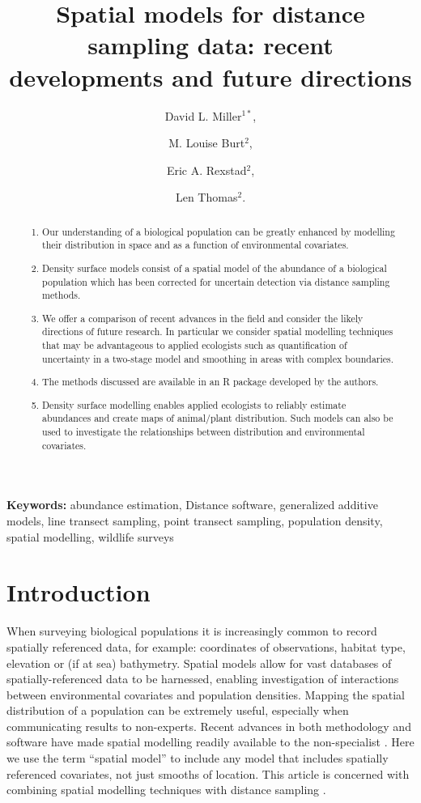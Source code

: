 \documentclass[a4paper,12pt]{article}
\title{Spatial models for distance sampling data: recent developments and future directions}
\author{
David L. Miller$^{1*}$, \and
M. Louise Burt$^{2}$, \and
Eric A. Rexstad$^{2}$, \and 
Len Thomas$^{2}$.}
\begin{document}
\maketitle

\begin{abstract}
  \noindent 

\begin{enumerate}
	\item Our understanding of a biological population can be greatly enhanced by modelling their distribution in space and as a function of environmental covariates. 
	\item Density surface models consist of a spatial model of the abundance of a biological population which has been corrected for uncertain detection via distance sampling methods. 
	\item We offer a comparison of recent advances in the field and consider the likely directions of future research. In particular we consider spatial modelling techniques that may be advantageous to applied ecologists such as quantification of uncertainty in a two-stage model and smoothing in areas with complex boundaries.
	\item The methods discussed are available in an \textsf{R} package developed by the authors.
	\item Density surface modelling enables applied ecologists to reliably estimate abundances and create maps of animal/plant distribution. Such models can also be used to investigate the relationships between distribution and environmental covariates.
\end{enumerate}
 

\end{abstract}

\noindent \textbf{Keywords:} abundance estimation, Distance software, generalized additive models, line transect sampling, point transect sampling, population density, spatial modelling, wildlife surveys


\newpage

\section*{Introduction}
\label{s:intro}

When surveying biological populations it is increasingly common to record spatially referenced data, for example: coordinates of observations, habitat type, elevation or (if at sea) bathymetry. Spatial models allow for vast databases of spatially-referenced data \citep[e.g. OBIS-SEAMAP,][]{Halpin:2009je} to be harnessed, enabling investigation of interactions between environmental covariates and population densities. Mapping the spatial distribution of a population can be extremely useful, especially when communicating results to non-experts. Recent advances in both methodology and software have made spatial modelling readily available to the non-specialist \citep[e.g.,][]{Wood:2006wz, Rue:2009tw}. Here we use the term ``spatial model'' to include any model that includes spatially referenced covariates, not just smooths of location. This article is concerned with combining spatial modelling techniques with distance sampling \citep{Buckland:2001vm, Buckland:2004ts}. 
\end{document}
